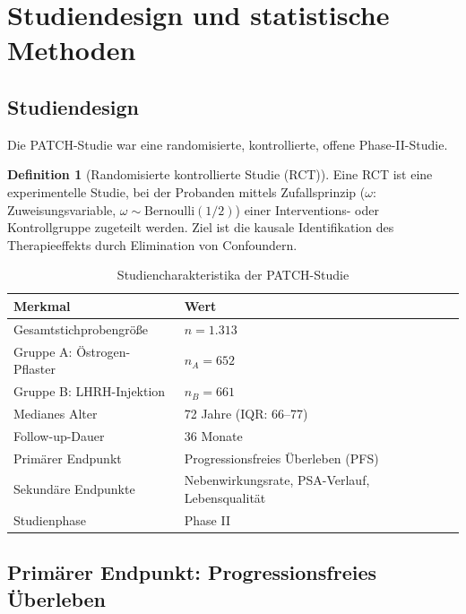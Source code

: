 ﻿\documentclass[a4paper,12pt]{article}
\theoremstyle{definition}
\newtheorem{definition}{Definition}
\begin{document}
\section{Studiendesign und statistische Methoden}

\subsection{Studiendesign}

Die PATCH-Studie war eine randomisierte, kontrollierte, offene Phase-II-Studie.

\begin{definition}[Randomisierte kontrollierte Studie (RCT)]
Eine RCT ist eine experimentelle Studie, bei der Probanden mittels Zufallsprinzip ($\omega$: Zuweisungsvariable, $\omega \sim \mathrm{Bernoulli}(1/2)$) einer Interventions- oder Kontrollgruppe zugeteilt werden.
Ziel ist die kausale Identifikation des Therapieeffekts durch Elimination von Confoundern.
\end{definition}

\begin{table}[h!]
\centering
\caption{Studiencharakteristika der PATCH-Studie}
\label{tab:studie}
\begin{tabular}{ll}
\toprule
\textbf{Merkmal} & \textbf{Wert} \\
\midrule
Gesamtstichprobengröße & $n = 1.313$ \\
Gruppe A: Östrogen-Pflaster & $n_A = 652$ \\
Gruppe B: LHRH-Injektion & $n_B = 661$ \\
Medianes Alter & 72 Jahre (IQR: 66--77) \\
Follow-up-Dauer & 36 Monate \\
Primärer Endpunkt & Progressionsfreies Überleben (PFS) \\
Sekundäre Endpunkte & Nebenwirkungsrate, PSA-Verlauf, Lebensqualität \\
Studienphase & Phase II \\
\bottomrule
\end{tabular}
\end{table}

\subsection{Primärer Endpunkt: Progressionsfreies Überleben}
\end{document}
